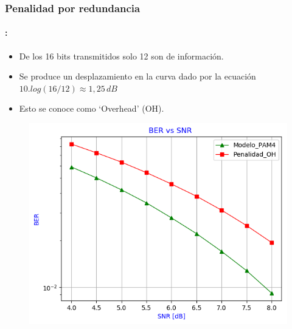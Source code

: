 
\begin{frame}
  \frametitle{\textbf{Penalidad por redundancia}}
\framesubtitle{\secname : \subsecname}
   \begin{block}{}
    \begin{itemize}
    \item De los 16 bits transmitidos solo 12 son de información.
    \item Se produce un desplazamiento en la curva dado por la ecuación $ 10.log(16/12)\approx1,25\, dB$
    \item Esto se conoce como `Overhead' (OH).
    \end{itemize}
    \end{block}
       \vspace{-0.3cm}
    \begin{figure}
      \centering
      \includegraphics[width=0.50\paperwidth]{Graficos/BER_vs_SNR_2.png}%
    \end{figure}
\end{frame}

